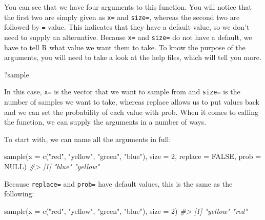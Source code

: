 \documentclass[
]{book}
\newenvironment{Shaded}{\begin{snugshade}}{\end{snugshade}}
\newcommand{\AttributeTok}[1]{\textcolor[rgb]{0.77,0.63,0.00}{#1}}
\newcommand{\CommentTok}[1]{\textcolor[rgb]{0.56,0.35,0.01}{\textit{#1}}}
\newcommand{\ConstantTok}[1]{\textcolor[rgb]{0.00,0.00,0.00}{#1}}
\newcommand{\DecValTok}[1]{\textcolor[rgb]{0.00,0.00,0.81}{#1}}
\newcommand{\FunctionTok}[1]{\textcolor[rgb]{0.00,0.00,0.00}{#1}}
\newcommand{\NormalTok}[1]{#1}
\newcommand{\StringTok}[1]{\textcolor[rgb]{0.31,0.60,0.02}{#1}}
\begin{document}
You can see that we have four arguments to this function. You will notice that the first two are simply given as \texttt{x=} and \texttt{size=}, whereas the second two are followed by \texttt{=} value. This indicates that they have a default value, so we don't need to supply an alternative. Because \texttt{x=} and \texttt{size=} do not have a default, we have to tell R what value we want them to take. To know the purpose of the arguments, you will need to take a look at the help files, which will tell you more.

\begin{Shaded}
\begin{Highlighting}[]
\NormalTok{?sample}
\end{Highlighting}
\end{Shaded}

In this case, \texttt{x=} is the vector that we want to sample from and \texttt{size=} is the number of samples we want to take, whereas replace allows us to put values back and we can set the probability of each value with prob. When it comes to calling the function, we can supply the arguments in a number of ways.

To start with, we can name all the arguments in full:

\begin{Shaded}
\begin{Highlighting}[]
\FunctionTok{sample}\NormalTok{(}\AttributeTok{x =} \FunctionTok{c}\NormalTok{(}\StringTok{"red"}\NormalTok{, }\StringTok{"yellow"}\NormalTok{, }\StringTok{"green"}\NormalTok{, }\StringTok{"blue"}\NormalTok{), }\AttributeTok{size =} \DecValTok{2}\NormalTok{, }\AttributeTok{replace =} \ConstantTok{FALSE}\NormalTok{, }\AttributeTok{prob =} \ConstantTok{NULL}\NormalTok{)}
\CommentTok{\#\textgreater{} [1] "blue"   "yellow"}
\end{Highlighting}
\end{Shaded}

Because \texttt{replace=} and \texttt{prob=} have default values, this is the same as the following:

\begin{Shaded}
\begin{Highlighting}[]
\FunctionTok{sample}\NormalTok{(}\AttributeTok{x =} \FunctionTok{c}\NormalTok{(}\StringTok{"red"}\NormalTok{, }\StringTok{"yellow"}\NormalTok{, }\StringTok{"green"}\NormalTok{, }\StringTok{"blue"}\NormalTok{), }\AttributeTok{size =} \DecValTok{2}\NormalTok{)}
\CommentTok{\#\textgreater{} [1] "yellow" "red"}
\end{Highlighting}
\end{Shaded}
\end{document}
